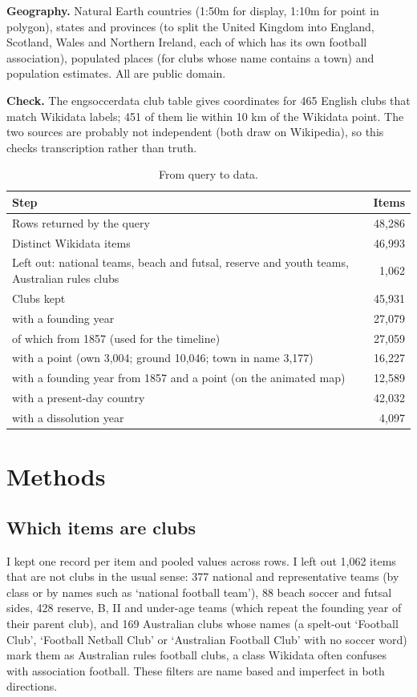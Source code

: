 \documentclass[11pt,a4paper]{article}
\begin{document}
\textbf{Geography.} Natural Earth \citep{naturalearth} countries (1:50m for display, 1:10m for point in polygon), states and provinces (to split the United Kingdom into England, Scotland, Wales and Northern Ireland, each of which has its own football association), populated places (for clubs whose name contains a town) and population estimates. All are public domain.

\textbf{Check.} The engsoccerdata club table \citep{engsoccer} gives coordinates for 465 English clubs that match Wikidata labels; 451 of them lie within 10 km of the Wikidata point. The two sources are probably not independent (both draw on Wikipedia), so this checks transcription rather than truth.

\begin{table}[tbp]\centering\small\caption{From query to data.}\label{tab:pipe}\begin{tabular}{p{9.5cm}r}\toprule Step & Items\\\midrule
Rows returned by the query & 48,286\\
Distinct Wikidata items & 46,993\\
Left out: national teams, beach and futsal, reserve and youth teams, Australian rules clubs & 1,062\\
Clubs kept & 45,931\\
\quad with a founding year & 27,079\\
\quad\quad of which from 1857 (used for the timeline) & 27,059\\
\quad with a point (own 3,004; ground 10,046; town in name 3,177) & 16,227\\
\quad with a founding year from 1857 and a point (on the animated map) & 12,589\\
\quad with a present-day country & 42,032\\
\quad with a dissolution year & 4,097\\
\bottomrule\end{tabular}\end{table}

\section{Methods}
\subsection{Which items are clubs}
I kept one record per item and pooled values across rows. I left out 1,062 items that are not clubs in the usual sense: 377 national and representative teams (by class or by names such as `national football team'), 88 beach soccer and futsal sides, 428 reserve, B, II and under-age teams (which repeat the founding year of their parent club), and 169 Australian clubs whose names (a spelt-out `Football Club', `Football Netball Club' or `Australian Football Club' with no soccer word) mark them as Australian rules football clubs, a class Wikidata often confuses with association football. These filters are name based and imperfect in both directions.
\end{document}
